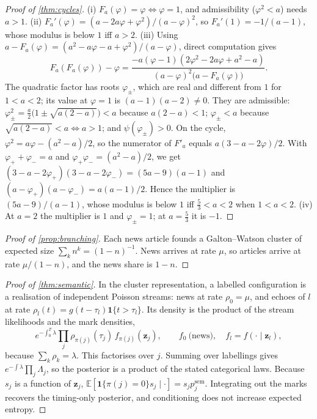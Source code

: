 \documentclass[11pt,a4paper]{article}
\theoremstyle{sci}
\theoremstyle{scidef}
\newcommand{\E}{\mathbb{E}}
\newcommand{\z}{\bm{z}}
\newcommand{\ind}{\mathbf{1}}
\begin{document}
\begin{proof}[Proof of \cref{thm:cycles}]
(i) $F_a(\varphi)=\varphi\iff\varphi=1$, and admissibility ($\varphi^2<a$) needs $a>1$.
(ii) $F_a'(\varphi)=(a-2a\varphi+\varphi^2)/(a-\varphi)^2$, so $F_a'(1)=-1/(a-1)$, whose modulus is below $1$ iff $a>2$.
(iii) Using $a-F_a(\varphi)=(a^2-a\varphi-a+\varphi^2)/(a-\varphi)$, direct computation gives
\[
  F_a(F_a(\varphi))-\varphi=\frac{-a(\varphi-1)(2\varphi^2-2a\varphi+a^2-a)}{(a-\varphi)^2\big(a-F_a(\varphi)\big)} .
\]
The quadratic factor has roots $\varphi_\pm$, which are real and different from $1$ for $1<a<2$; its value at $\varphi=1$ is $(a-1)(a-2)\neq0$. They are admissible: $\varphi_\pm^2=\tfrac a2\big(1\pm\sqrt{a(2-a)}\big)<a$ because $a(2-a)<1$; $\varphi_\pm<a$ because $\sqrt{a(2-a)}<a\iff a>1$; and $\psi(\varphi_\pm)>0$. On the cycle, $\varphi^2=a\varphi-(a^2-a)/2$, so the numerator of $F'_a$ equals $a(3-a-2\varphi)/2$. With $\varphi_++\varphi_-=a$ and $\varphi_+\varphi_-=(a^2-a)/2$, we get $(3-a-2\varphi_+)(3-a-2\varphi_-)=(5a-9)(a-1)$ and $(a-\varphi_+)(a-\varphi_-)=a(a-1)/2$. Hence the multiplier is $(5a-9)/(a-1)$, whose modulus is below $1$ iff $\tfrac53<a<2$ when $1<a<2$.
(iv) At $a=2$ the multiplier is $1$ and $\varphi_\pm=1$; at $a=\tfrac53$ it is $-1$.
\end{proof}

\begin{proof}[Proof of \cref{prop:branching}]
Each news article founds a Galton--Watson cluster of expected size $\sum_kn^k=(1-n)^{-1}$. News arrives at rate $\mu$, so articles arrive at rate $\mu/(1-n)$, and the news share is $1-n$.
\end{proof}

\begin{proof}[Proof of \cref{thm:semantic}]
In the cluster representation, a labelled configuration is a realisation of independent Poisson streams: news at rate $\rho_0=\mu$, and echoes of $l$ at rate $\rho_l(t)=g(t-\tau_l)\ind\{t>\tau_l\}$. Its density is the product of the stream likelihoods and the mark densities,
\[
  e^{-\int_0^T\lambda}\prod_{j}\rho_{\pi(j)}(\tau_j)\,f_{\pi(j)}(\z_j),\qquad f_0\ \text{(news)},\quad f_l=f(\cdot\mid\z_l),
\]
because $\sum_k\rho_k=\lambda$. This factorises over $j$. Summing over labellings gives $e^{-\int\lambda}\prod_j\Lambda_j$, so the posterior is a product of the stated categorical laws. Because $s_j$ is a function of $\z_j$, $\E[\ind\{\pi(j)=0\}s_j\mid\cdot]=s_jp^{\mathrm{sem}}_j$. Integrating out the marks recovers the timing-only posterior, and conditioning does not increase expected entropy.
\end{proof}
\end{document}
